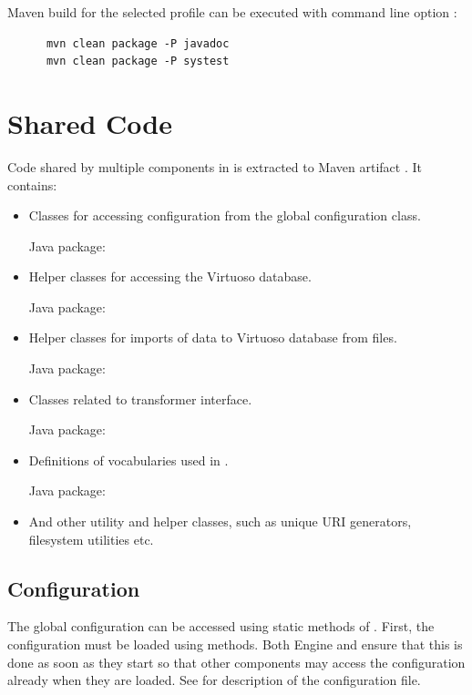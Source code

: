 Maven build for the selected profile can be executed with command line option :

\begin{verbatim}
      mvn clean package -P javadoc
      mvn clean package -P systest	
\end{verbatim}

\chapter{Shared Code}
Code shared by multiple components in \odcs is extracted to Maven artifact . It contains:

\begin{itemize}
	\item Classes for accessing configuration from the global configuration class.

		Java package: 
	\item Helper classes for accessing the Virtuoso database.

		Java package: 

	\item Helper classes for imports of data to Virtuoso database from files.

		Java package: 

	\item Classes related to transformer interface.

		Java package: 

	\item Definitions of vocabularies used in \odcs.

		Java package: 

	\item And other utility and helper classes, such as unique URI generators, filesystem utilities etc.
\end{itemize}

\section{Configuration}
The global configuration can be accessed using static methods of . First, the configuration must be loaded using  methods. Both Engine and \FE ensure that this is done as soon as they start so that other components may access the configuration already when they are loaded. See  for description of the configuration file.

